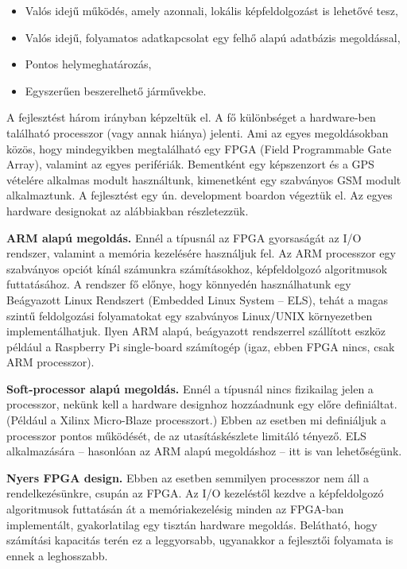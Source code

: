 \documentclass[a4paper,12pt]{report}
\begin{document}
\begin{itemize}
\item Valós idejű működés, amely azonnali, lokális képfeldolgozást is lehetővé tesz,
\item Valós idejű, folyamatos adatkapcsolat egy felhő alapú adatbázis megoldással,
\item Pontos helymeghatározás,
\item Egyszerűen beszerelhető járművekbe.
\end{itemize}

A fejlesztést három irányban képzeltük el. A fő különbséget a hardware-ben található processzor (vagy annak hiánya) jelenti. Ami az egyes megoldásokban közös, hogy mindegyikben megtalálható egy FPGA (Field Programmable Gate Array), valamint az egyes perifériák. Bementként egy képszenzort és a GPS vételére alkalmas modult használtunk, kimenetként egy szabványos GSM modult alkalmaztunk. A fejlesztést egy ún. development boardon végeztük el. Az egyes hardware designokat az alábbiakban részletezzük.

{\bf{ARM alapú megoldás.}} Ennél a típusnál az FPGA gyorsaságát az I/O rendszer, valamint a memória kezelésére használjuk fel. Az ARM processzor egy szabványos opciót kínál számunkra számításokhoz, képfeldolgozó algoritmusok futtatásához. A rendszer fő előnye, hogy könnyedén használhatunk egy Beágyazott Linux Rendszert (Embedded Linux System -- ELS), tehát a magas szintű feldolgozási folyamatokat egy szabványos Linux/UNIX környezetben implementálhatjuk. Ilyen ARM alapú, beágyazott rendszerrel szállított eszköz például a Raspberry Pi single-board számítogép (igaz, ebben FPGA nincs, csak ARM processzor).

{\bf{Soft-processor alapú megoldás.}} Ennél a típusnál nincs fizikailag jelen a processzor, nekünk kell a hardware designhoz hozzáadnunk egy előre definiáltat. (Például a Xilinx Micro-Blaze processzort.) Ebben az esetben mi definiáljuk a processzor pontos működését, de az utasításkészlete limitáló tényező. ELS alkalmazására -- hasonlóan az ARM alapú megoldáshoz -- itt is van lehetőségünk.

{\bf{Nyers FPGA design.}} Ebben az esetben semmilyen processzor nem áll a rendelkezésünkre, csupán az FPGA. Az I/O kezeléstől kezdve a képfeldolgozó algoritmusok futtatásán át a memóriakezelésig minden az FPGA-ban implementált, gyakorlatilag egy tisztán hardware megoldás. Belátható, hogy számítási kapacitás terén ez a leggyorsabb, ugyanakkor a fejlesztői folyamata is ennek a leghosszabb.
\end{document}
